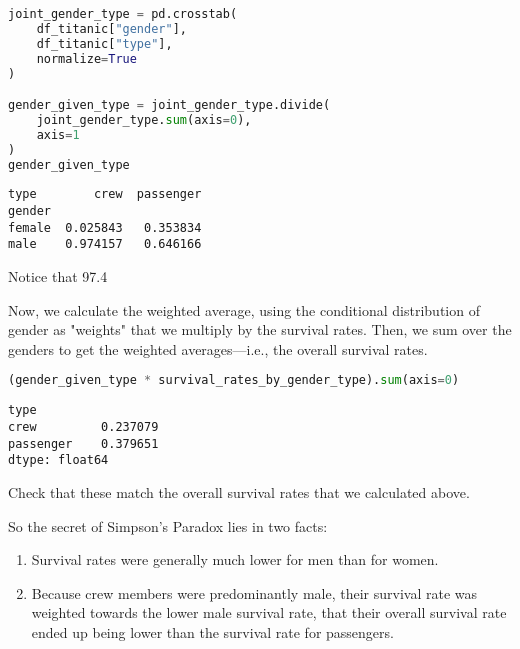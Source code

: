 \begin{lstlisting}[language=Python]
joint_gender_type = pd.crosstab(
    df_titanic["gender"],
    df_titanic["type"],
    normalize=True
)

gender_given_type = joint_gender_type.divide(
    joint_gender_type.sum(axis=0),
    axis=1
)
gender_given_type
\end{lstlisting}

\small\begin{verbatim}
type        crew  passenger
gender                     
female  0.025843   0.353834
male    0.974157   0.646166
\end{verbatim}



Notice that 97.4%

Now, we calculate the weighted average, using the conditional distribution of gender as "weights" that we multiply by the survival rates. Then, we sum over the genders to get the weighted averages---i.e., the overall survival rates.

\begin{lstlisting}[language=Python]
(gender_given_type * survival_rates_by_gender_type).sum(axis=0)
\end{lstlisting}

\small\begin{verbatim}
type
crew         0.237079
passenger    0.379651
dtype: float64
\end{verbatim}



Check that these match the overall survival rates that we calculated above.

So the secret of Simpson's Paradox lies in two facts:
\begin{enumerate}
\item 
Survival rates were generally much lower for men than for women.

\item 
Because crew members were predominantly male, their survival rate was weighted towards the lower male survival rate, that their overall survival rate ended up being lower than the survival rate for passengers.

\end{enumerate}

